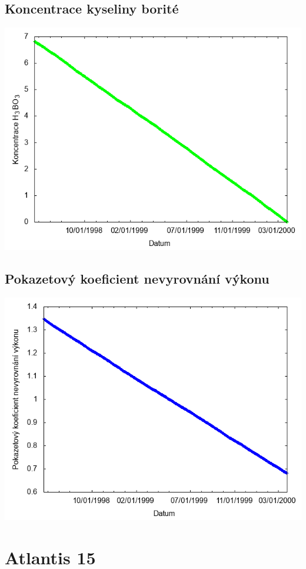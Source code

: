 \documentclass[a4paper,twoside,11pt]{article}
\begin{document}
\subsection*{Koncentrace kyseliny borité}
\begin{center}
\includegraphics[width=.8\textwidth]{graphs/Atlantis_14_bc.png}
\end{center}

\subsection*{Pokazetový koeficient nevyrovnání výkonu}
\begin{center}
\includegraphics[width=.8\textwidth]{graphs/Atlantis_14_fha.png}
\end{center}

\newpage
\section*{Atlantis 15}
\end{document}
